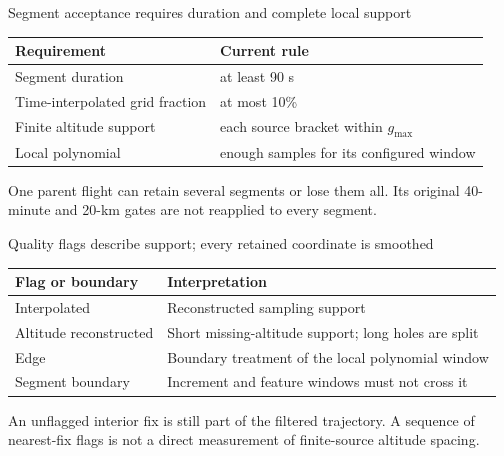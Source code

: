 \documentclass[11pt,aspectratio=169]{beamer}
\begin{document}
\begin{frame}{Segment acceptance requires duration and complete local support}
\small
\begin{center}
\begin{tabular}{@{}ll@{}}\toprule
Requirement & Current rule\\\midrule
Segment duration & at least 90 s\\
Time-interpolated grid fraction & at most 10\%\\
Finite altitude support & each source bracket within $g_{\max}$\\
Local polynomial & enough samples for its configured window\\\bottomrule
\end{tabular}
\end{center}
One parent flight can retain several segments or lose them all. Its original
40-minute and 20-km gates are not reapplied to every segment.
\end{frame}

\begin{frame}{Quality flags describe support; every retained coordinate is smoothed}
\small
\begin{tabular}{@{}lp{9cm}@{}}\toprule
Flag or boundary & Interpretation\\\midrule
Interpolated & Reconstructed sampling support\\
Altitude reconstructed & Short missing-altitude support; long holes are split\\
Edge & Boundary treatment of the local polynomial window\\
Segment boundary & Increment and feature windows must not cross it\\\bottomrule
\end{tabular}
\par\medskip
An unflagged interior fix is still part of the filtered trajectory. A sequence of
nearest-fix flags is not a direct measurement of finite-source altitude spacing.
\end{frame}
\end{document}
